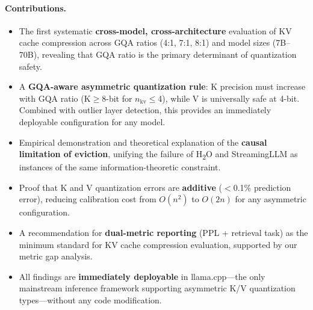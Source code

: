 \paragraph{Contributions.}
\begin{itemize}
    \item The first systematic \textbf{cross-model, cross-architecture} evaluation of KV cache compression across GQA ratios (4:1, 7:1, 8:1) and model sizes (7B--70B), revealing that GQA ratio is the primary determinant of quantization safety.
    \item A \textbf{GQA-aware asymmetric quantization rule}: K precision must increase with GQA ratio (K$\geq$8-bit for $n_\text{kv}\leq$4), while V is universally safe at 4-bit. Combined with outlier layer detection, this provides an immediately deployable configuration for any model.
    \item Empirical demonstration and theoretical explanation of the \textbf{causal limitation of eviction}, unifying the failure of H\textsubscript{2}O and StreamingLLM as instances of the same information-theoretic constraint.
    \item Proof that K and V quantization errors are \textbf{additive} ($<$0.1\% prediction error), reducing calibration cost from $O(n^2)$ to $O(2n)$ for any asymmetric configuration.
    \item A recommendation for \textbf{dual-metric reporting} (PPL + retrieval task) as the minimum standard for KV cache compression evaluation, supported by our metric gap analysis.
    \item All findings are \textbf{immediately deployable} in llama.cpp---the only mainstream inference framework supporting asymmetric K/V quantization types---without any code modification.
\end{itemize}
